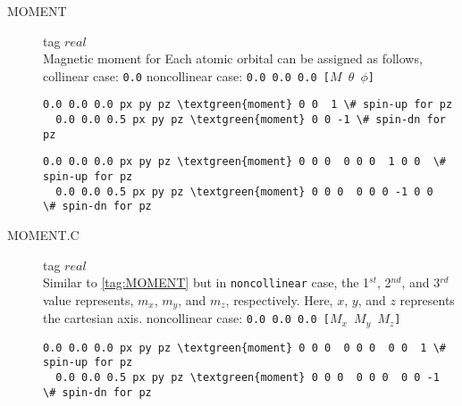 \documentclass[a4paper,12pt]{scrartcl}
\makeatletter
\def\namedlabel#1#2{\begingroup
    #2%
    \def\@currentlabel{#2}%
    \phantomsection\label{#1}\endgroup
}
\newcommand{\textgreen}[1]{\textcolor{green!50!black}{\texttt{#1}}}
\makeatother
\begin{document}
\begin{description}
\begin{Verbatim}[commandchars=\\\{\},gobble=4, frame=single, framesep=2mm, 
    label= setup of custumized atomic orbital name $cp1$,
    labelposition=bottomline]
\end{Verbatim}


    \item[\namedlabel{tag:MOMENT}{MOMENT}] tag $real$ \\
		Magnetic moment for Each atomic orbital can be assigned as follows,
	\subitem collinear case: \texttt{0.0}
    \subitem noncollinear case: \texttt{0.0 0.0 0.0 [$M$ $\theta$ $\phi$]}\\
\begin{Verbatim}[commandchars=\\\{\},gobble=4, frame=single, framesep=2mm, 
    label= usage of $moment$ tag in \ref{tag:GFILE} with $collinear$ magnetism,
    labelposition=bottomline]
  0.0 0.0 0.0 px py pz \textgreen{moment} 0 0  1 \# spin-up for pz
  0.0 0.0 0.5 px py pz \textgreen{moment} 0 0 -1 \# spin-dn for pz

\end{Verbatim}

\begin{Verbatim}[commandchars=\\\{\},gobble=4, frame=single, framesep=2mm, 
    label= usage of $moment$ tag in \ref{tag:GFILE} with $noncollinear$ magnetism,
    labelposition=bottomline]
  0.0 0.0 0.0 px py pz \textgreen{moment} 0 0 0  0 0 0  1 0 0  \# spin-up for pz
  0.0 0.0 0.5 px py pz \textgreen{moment} 0 0 0  0 0 0 -1 0 0  \# spin-dn for pz

\end{Verbatim}

    \item[\namedlabel{tag:MOMENT.C}{MOMENT.C}] tag $real$ \\
        Similar to \ref{tag:MOMENT} but in \texttt{noncollinear} case,
		the 1$^{st}$, 2$^{nd}$, and 3$^{rd}$ value represents, $m_x$, $m_y$, and $m_z$, respectively.
		Here, $x$, $y$, and $z$ represents the cartesian axis.
    \subitem noncollinear case: \texttt{0.0 0.0 0.0 [$M_x$ $M_y$ $M_z$]}\\

\begin{Verbatim}[commandchars=\\\{\},gobble=4, frame=single, framesep=2mm, 
    label= usage of $moment.c$ tag in \ref{tag:GFILE} with $noncollinear$ magnetism,
    labelposition=bottomline]
  0.0 0.0 0.0 px py pz \textgreen{moment} 0 0 0  0 0 0  0 0  1 \# spin-up for pz
  0.0 0.0 0.5 px py pz \textgreen{moment} 0 0 0  0 0 0  0 0 -1 \# spin-dn for pz

\end{Verbatim}

\end{description}
\end{document}
